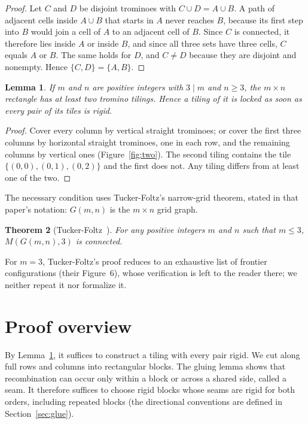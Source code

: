 \documentclass[11pt]{article}
\newtheorem{theorem}{Theorem}
\newtheorem{lemma}[theorem]{Lemma}
\theoremstyle{definition}
\theoremstyle{remark}
\begin{document}
\begin{proof}
Let $C$ and $D$ be disjoint trominoes with $C\cup D=A\cup B$. A path of
adjacent cells inside $A\cup B$ that starts in $A$ never reaches $B$, because
its first step into $B$ would join a cell of $A$ to an adjacent cell of $B$.
Since $C$ is connected, it therefore lies inside $A$ or inside $B$, and
since all three sets have three cells, $C$ equals $A$ or $B$. The same holds
for $D$, and $C\ne D$ because they are disjoint and nonempty. Hence
$\{C,D\}=\{A,B\}$.
\end{proof}

\begin{lemma}\label{lem:two}
If $m$ and $n$ are positive integers with $3\mid m$ and $n\ge3$, the $m\times n$ rectangle has at least two tromino
tilings. Hence a tiling of it is locked as soon as every pair of its tiles is
rigid.
\end{lemma}

\begin{proof}
Cover every column by vertical straight trominoes; or cover the first three
columns by horizontal straight trominoes, one in each row, and the remaining
columns by vertical ones (Figure~\ref{fig:two}). The second tiling contains
the tile $\{(0,0),(0,1),(0,2)\}$ and the first does not. Any tiling differs
from at least one of the two.
\end{proof}


The necessary condition uses Tucker-Foltz's narrow-grid theorem, stated in
that paper's notation: $G(m,n)$ is the $m\times n$ grid graph.

\begin{theorem}[{Tucker-Foltz~\cite[Theorem~3.1]{tf}}]\label{thm:narrow}
For any positive integers $m$ and $n$ such that $m\le3$, $M(G(m,n),3)$ is
connected.
\end{theorem}

For $m=3$, Tucker-Foltz's proof reduces to an exhaustive list of frontier
configurations (their Figure~6), whose verification is left to the reader
there; we neither repeat it nor formalize it.


\section{Proof overview}\label{sec:overview}

By Lemma~\ref{lem:two}, it suffices to construct a tiling with every pair
rigid. We cut along full rows and columns into rectangular blocks. The
gluing lemma shows that recombination can occur only within a block or
across a shared side, called a seam. It therefore suffices to choose rigid
blocks whose seams are rigid for both orders, including repeated blocks (the directional conventions are defined in
Section~\ref{sec:glue}).
\end{document}
